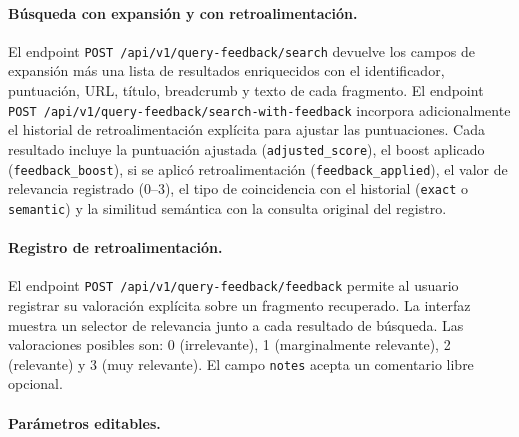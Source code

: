 \documentclass[11pt]{article}
\begin{document}
\paragraph{Búsqueda con expansión y con retroalimentación.}
El endpoint \texttt{POST /api/v1/query-feedback/search} devuelve los campos de expansión más
una lista de resultados enriquecidos con el identificador, puntuación, URL, título, breadcrumb
y texto de cada fragmento. El endpoint \texttt{POST /api/v1/query-feedback/search-with-feedback}
incorpora adicionalmente el historial de retroalimentación explícita para ajustar las
puntuaciones. Cada resultado incluye la puntuación ajustada (\texttt{adjusted\_score}), el
boost aplicado (\texttt{feedback\_boost}), si se aplicó retroalimentación
(\texttt{feedback\_applied}), el valor de relevancia registrado (0--3), el tipo de coincidencia
con el historial (\texttt{exact} o \texttt{semantic}) y la similitud semántica con la consulta
original del registro.

\paragraph{Registro de retroalimentación.}
El endpoint \texttt{POST /api/v1/query-feedback/feedback} permite al usuario registrar su
valoración explícita sobre un fragmento recuperado. La interfaz muestra un selector de
relevancia junto a cada resultado de búsqueda. Las valoraciones posibles son: 0 (irrelevante),
1 (marginalmente relevante), 2 (relevante) y 3 (muy relevante). El campo \texttt{notes}
acepta un comentario libre opcional.

\paragraph{Parámetros editables.}
\end{document}
